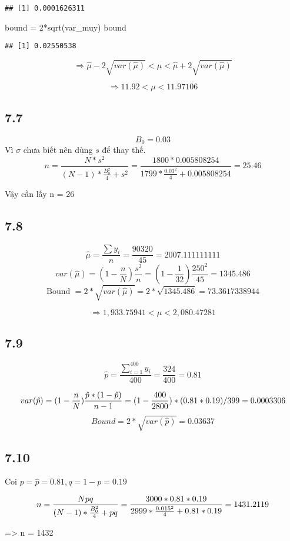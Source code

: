\documentclass[
]{article}
\newenvironment{Shaded}{\begin{snugshade}}{\end{snugshade}}
\newcommand{\DecValTok}[1]{\textcolor[rgb]{0.00,0.00,0.81}{#1}}
\newcommand{\FunctionTok}[1]{\textcolor[rgb]{0.00,0.00,0.00}{#1}}
\newcommand{\NormalTok}[1]{#1}
\newcommand{\OtherTok}[1]{\textcolor[rgb]{0.56,0.35,0.01}{#1}}
\newcommand{\SpecialCharTok}[1]{\textcolor[rgb]{0.00,0.00,0.00}{#1}}
\begin{document}
\begin{verbatim}
## [1] 0.0001626311
\end{verbatim}

\begin{Shaded}
\begin{Highlighting}[]
\NormalTok{bound }\OtherTok{=} \DecValTok{2}\SpecialCharTok{*}\FunctionTok{sqrt}\NormalTok{(var\_muy)}
\NormalTok{bound}
\end{Highlighting}
\end{Shaded}

\begin{verbatim}
## [1] 0.02550538
\end{verbatim}

\[\Rightarrow \hat{\mu} -2\sqrt{var(\hat{\mu})} < \mu < \hat{\mu} +2\sqrt{var(\hat{\mu})}\]

\[\Rightarrow 11.92 < \mu < 11.97106\]

\hypertarget{section-6}{%
\subsection{7.7}\label{section-6}}

\[
B_0 = 0.03
\] Vì \(\sigma\) chưa biết nên dùng \(s\) để thay thế. \[
n = \frac{N*s^2}{(N-1)*\frac{B_0^2}4+s^2} =
\frac{1800*0.005808254}{1799*\frac{0.03^2}{4}+0.005808254} = 25.46 
\]

Vậy cần lấy n = 26

\hypertarget{section-7}{%
\subsection{7.8}\label{section-7}}

\[
\hat{\mu} = \frac{\sum y_i} n = \frac{90320}{45} = 2007.111111111
\] \[
var(\hat{\mu}) = (1-\frac n N) \frac{s^2}{n} = (1-\frac{1}{32})\frac{250^2}{45} = 1345.486
\]
\[\text{Bound } = 2*\sqrt{var(\hat{\mu})} = 2*\sqrt{1345.486} = 73.3617338944\]

\[\Rightarrow 1,933.75941 < \mu < 2,080.47281\]

\hypertarget{section-8}{%
\subsection{7.9}\label{section-8}}

\[
\hat{p} = \frac{\sum_{i=1}^{400}y_i}{400} = \frac{324}{400}=0.81
\]

\[
var(\hat{p}) = (1-\frac{n}N)\frac{\hat{p}*(1-\hat{p})}{n-1} \\
= (1-\frac{400}{2800})*(0.81*0.19)/399 = 0.0003306
\] \[
Bound = 2*\sqrt{var(\hat{p})} =  0.03637
\]

\hypertarget{section-9}{%
\subsection{7.10}\label{section-9}}

Coi \(p = \hat{p} = 0.81, q = 1-p = 0.19\)

\[
n = \frac{Npq}{(N-1)*\frac{B_0^2}{4} + pq}
\\= \frac{3000*0.81*0.19}{2999*\frac{0.015^2}{4}+0.81*0.19}
\\= 1431.2119
\]

=\textgreater{} n = 1432
\end{document}
